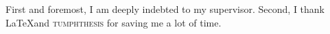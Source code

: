First and foremost, I am deeply indebted to my supervisor. Second, I thank \LaTeX and \textsc{tumphthesis} for saving me a lot of time.
